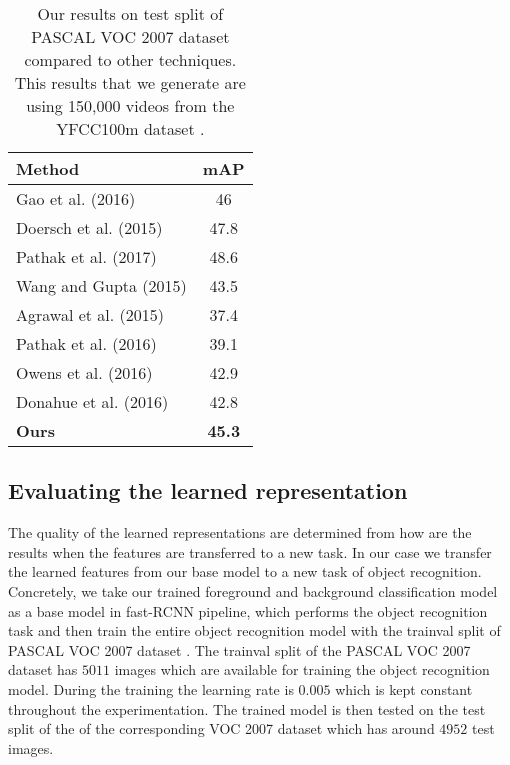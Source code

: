 \documentclass[10pt,twocolumn,letterpaper]{article}
\begin{document}
\begin{table}
\begin{center}
\begin{tabular}{|l|c|}
\hline
\textbf{Method} & \textbf{mAP} \\
\hline\hline
Gao et al. (2016) \cite{gao2016object} & 46 \\
Doersch et al. (2015) \cite{doersch2015unsupervised}  & 47.8 \\
Pathak et al. (2017) \cite{pathak2017learning}  & 48.6 \\
Wang and Gupta (2015) \cite{wang2015unsupervised} & 43.5 \\
Agrawal et al. (2015) \cite{agrawal2015learning} & 37.4          \\
Pathak et al. (2016) \cite{pathak2016context}  & 39.1          \\
Owens et al. (2016) \cite{owens2016ambient}   & 42.9          \\
Donahue et al. (2016) \cite{donahue2016adversarial} & 42.8          \\\hline
\textbf{Ours}         & \textbf{45.3} \\
\hline
\end{tabular}
\end{center}

\caption{Our results on test split of PASCAL VOC 2007 \cite{pascal-voc-2007} dataset compared to other techniques. This results that we generate are using 150,000 videos from the YFCC100m dataset \cite{thomee2016yfcc100m}.}

\label{tab1: map results}

\end{table}




\subsection{Evaluating the learned representation}
The quality of the learned representations are determined from how are the results when the features are transferred to a new task. In our case we transfer the learned features from our base model to a new task of object recognition. Concretely, we take our trained foreground and background classification model as a base model in fast-RCNN \cite{girshick2015fast} pipeline, which performs the object recognition task and then train the entire object recognition model with the trainval split of PASCAL VOC 2007 dataset \cite{pascal-voc-2007}. The trainval split of the PASCAL VOC 2007 dataset has $5011$ images which are available for training the object recognition model. During the training the learning rate is $0.005$ which is kept constant throughout the experimentation. The trained model is then tested on the test split of the of the corresponding VOC 2007 dataset which has around $4952$ test images.
\end{document}
